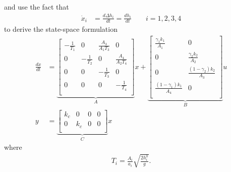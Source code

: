 \documentclass[a4paper,12pt,oneside,onecolumn]{article}
\begin{document}
and use the fact that 
\begin{align*}
    \Dot{x}_i &= \frac{d\Delta h_i}{dt} = \frac{dh_i}{dt} \qquad i = 1,2,3,4
\end{align*}
to derive the state-space formulation
\begin{align}
\frac{dx}{dt} & = \underbrace{\begin{bmatrix}
-\frac{1}{T_1}  & 0 & \frac{A_3}{A_1 T_3} & 0 \\
0 & -\frac{1}{T_2} & 0 & \frac{A_4}{A_2 T_4} \\
0 & 0 & -\frac{1}{T_3} &  0 \\
0 & 0 & 0 & -\frac{1}{T_4} \\
\end{bmatrix}}_A x 
+ \underbrace{\begin{bmatrix}
\frac{\gamma_1 k_1}{A_1} & 0 \\
0 & \frac{\gamma_2 k_2}{A_2} \\
0 & \frac{(1-\gamma_2) k_2}{A_3}\\
\frac{(1-\gamma_1) k_1}{A_4} & 0 \\
\end{bmatrix}}_B u  \\
y & = \underbrace{\begin{bmatrix}
k_c & 0 & 0 & 0 \\
0 & k_c & 0 & 0 \\
\end{bmatrix}}_C x
\end{align}
where
\begin{align}
T_i = \frac{A_i}{a_i} \sqrt{\frac{2 h_i^0}{g}}.
\end{align}
\end{document}
